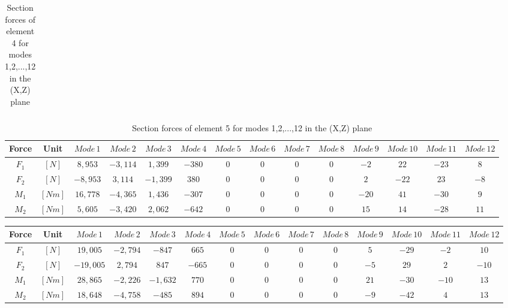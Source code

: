 \documentclass[11pt,a4paper,titlepage]{report}
\begin{document}
\begin{appendix}
\begin{landscape}
\begin{table}[]
\begin{tiny}
\begin{tabular}{c|c|c|c|c|c|c|c|c|c|c|c|c|c}
        \end{tabular}
        \end{tiny}
    \caption{Section forces of element 4 for modes 1,2,...,12 in the (X,Z) plane}
    \label{tab:my_label}
\end{table}
\begin{table}[]
    \centering
    \begin{tiny}
    \begin{tabular}{c|c|c|c|c|c|c|c|c|c|c|c|c|c}
    Force & Unit & $Mode\,1$ & $Mode\,2$ & $Mode\,3$ & $Mode\,4$ & $Mode\,5$ & $Mode\,6$ & $Mode\,7$ & $Mode\,8$ & $Mode\,9$ & $Mode\,10$ & $Mode\,11$ & $Mode\,12$\\
    \hline
   $F_1$ & $[N]$ & $8,953$ & $-3,114$ & $1,399$ & $-380$ & $0$ & $0$ & $0$ & $0$ & $-2$ & $22$ & $-23$ &  $8$\\
   $F_2$ & $[N]$ & $-8,953$ & $3,114$ & $-1,399$ & $380$ & $0$ & $0$ & $0$ & $0$ & $2$ & $-22$ & $23$ &  $-8$\\
    $M_1$ & $[Nm]$ & $ 16,778$ & $-4,365$ & $1,436$ & $-307$ & $0$ & $0$ & $0$ & $0$ & $-20$ & $41$ & $-30$ &  $9$\\
    $M_2$ & $[Nm]$ & $ 5,605$ &  $-3,420$ &  $2,062$ &  $-642$ & $0$ & $0$ & $0$ & $0$ & $15$ & $14$ & $-28$ & $11$\\
        \end{tabular}
        \end{tiny}
    \caption{Section forces of element 5 for modes 1,2,...,12 in the (X,Z) plane}
    \label{tab:my_label}
\end{table}
\begin{table}[]
    \centering
    \begin{tiny}
    \begin{tabular}{c|c|c|c|c|c|c|c|c|c|c|c|c|c}
    Force & Unit & $Mode\,1$ & $Mode\,2$ & $Mode\,3$ & $Mode\,4$ & $Mode\,5$ & $Mode\,6$ & $Mode\,7$ & $Mode\,8$ & $Mode\,9$ & $Mode\,10$ & $Mode\,11$ & $Mode\,12$\\
    \hline
   $F_1$ & $[N]$ & $19,005 $ & $-2,794 $ & $-847$ & $665$ & $0$ & $0$ & $0$ & $0$ & $5$ & $-29$ & $-2$ &  $10$\\
   $F_2$ & $[N]$ & $-19,005 $ & $2,794 $ & $847$ & $-665$ & $0$ & $0$ & $0$ & $0$ & $-5$ & $29$ & $2$ &  $-10$\\
    $M_1$ & $[Nm]$ & $28,865$ & $-2,226$ & $-1,632$ & $ 770$ & $0$ & $0$ & $0$ & $0$ & $21$ & $-30$ & $-10$ &  $13$\\
    $M_2$ & $[Nm]$ & $18,648$ &  $-4,758$ &  $-485$ &  $894$ & $0$ & $0$ & $0$ & $0$ & $-9$ & $-42$ & $4$ & $13$\\

\end{tabular}
\end{tiny}
\end{table}
\end{landscape}
\end{appendix}
\end{document}
